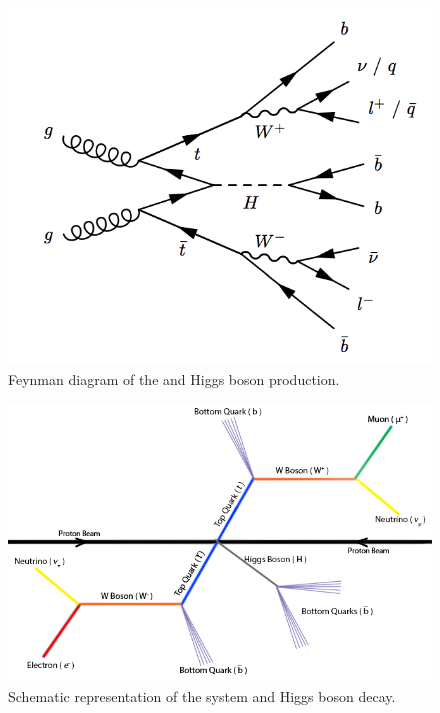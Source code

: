 \begin{figure}[!htp]
	\begin{center}
		\includegraphics[scale=0.3]{imgs/ttH_feynman.png}
		\caption{Feynman diagram of the \ttbar and Higgs boson production.}
		\label{fig:ttH}
	\end{center}
\end{figure}

\begin{figure}[!htp]
	\begin{center}
		\includegraphics[scale=0.45]{imgs/ttbar_higgs.png}
		\caption{Schematic representation of the \ttbar system and Higgs boson decay.}
		\label{fig:ttbar}
	\end{center}
\end{figure}

